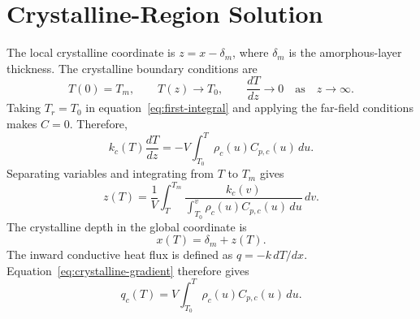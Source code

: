 \documentclass[11pt]{article}
\begin{document}
\section{Crystalline-Region Solution}
The local crystalline coordinate is $z=x-\delta_m$, where $\delta_m$ is the
amorphous-layer thickness. The crystalline boundary
conditions are
\begin{equation}
 T(0)=T_m,
 \qquad
 T(z)\rightarrow T_0,
 \qquad
 \frac{dT}{dz}\rightarrow0
 \quad\text{as}\quad z\rightarrow\infty.
 \label{eq:crystalline-bc}
\end{equation}
Taking $T_r=T_0$ in equation~\eqref{eq:first-integral} and applying the
far-field conditions makes $C=0$. Therefore,
\begin{equation}
 k_c(T)\frac{dT}{dz}
 =-V\int_{T_0}^{T}\rho_c(u)C_{p,c}(u)\,du.
 \label{eq:crystalline-gradient}
\end{equation}
Separating variables and integrating from $T$ to $T_m$ gives
\begin{equation}
 z(T)=\frac{1}{V}\int_T^{T_m}
 \frac{k_c(v)}{\displaystyle\int_{T_0}^{v}
 \rho_c(u)C_{p,c}(u)\,du}\,dv.
 \label{eq:crystalline-depth}
\end{equation}
The crystalline depth in the global coordinate is
\begin{equation}
 x(T)=\delta_m+z(T).
 \label{eq:crystalline-global}
\end{equation}
The inward conductive heat flux is defined as
$q=-k\,dT/dx$. Equation~\eqref{eq:crystalline-gradient} therefore gives
\begin{equation}
 q_c(T)=V\int_{T_0}^{T}\rho_c(u)C_{p,c}(u)\,du.
 \label{eq:crystalline-flux}
\end{equation}
\end{document}
